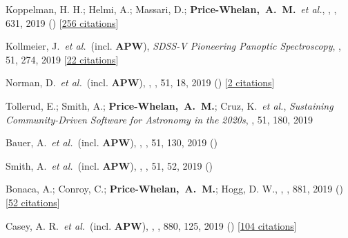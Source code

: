 \item[{\color{deemph}\scriptsize64}]Koppelman, H. H.; Helmi, A.; Massari, D.; \textbf{Price-Whelan,~A.~M.}~\textit{et al.}, , \aanda, 631, 2019 () [\href{http://adsabs.harvard.edu/abs/2019A&A...631L...9K}{256 citations}]

\item[{\color{deemph}\scriptsize63}]Kollmeier, J.~\textit{et al.}~(incl. \textbf{APW}), \textit{SDSS-V Pioneering Panoptic Spectroscopy}, \baas, 51, 274, 2019 [\href{http://adsabs.harvard.edu/abs/2019BAAS...51g.274K}{22 citations}]

\item[{\color{deemph}\scriptsize62}]Norman, D.~\textit{et al.}~(incl. \textbf{APW}), , \baas, 51, 18, 2019 () [\href{http://adsabs.harvard.edu/abs/2019BAAS...51g..18N}{2 citations}]

\item[{\color{deemph}\scriptsize61}]Tollerud, E.; Smith, A.; \textbf{Price-Whelan,~A.~M.}; Cruz, K.~\textit{et al.}, \textit{Sustaining Community-Driven Software for Astronomy in the 2020s}, \baas, 51, 180, 2019

\item[{\color{deemph}\scriptsize60}]Bauer, A.~\textit{et al.}~(incl. \textbf{APW}), , \baas, 51, 130, 2019 ()

\item[{\color{deemph}\scriptsize59}]Smith, A.~\textit{et al.}~(incl. \textbf{APW}), , \baas, 51, 52, 2019 ()

\item[{\color{deemph}\scriptsize58}]Bonaca, A.; Conroy, C.; \textbf{Price-Whelan,~A.~M.}; Hogg, D. W., , \apj, 881, 2019 () [\href{http://adsabs.harvard.edu/abs/2019ApJ...881L..37B}{52 citations}]

\item[{\color{deemph}\scriptsize57}]Casey, A. R.~\textit{et al.}~(incl. \textbf{APW}), , \apj, 880, 125, 2019 () [\href{http://adsabs.harvard.edu/abs/2019ApJ...880..125C}{104 citations}]

